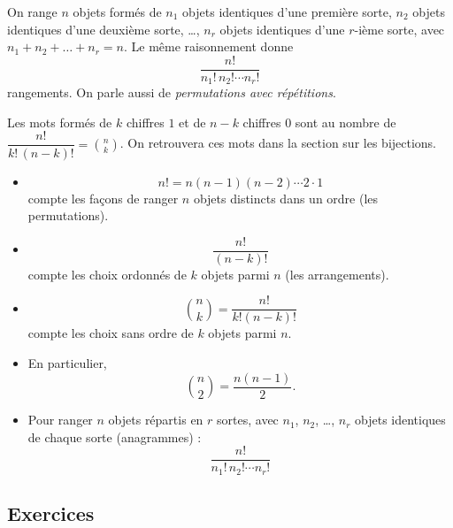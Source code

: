 \documentclass[11pt]{article}
\begin{document}
\begin{proposition}\label{prop:anagrammes}
On range \(n\) objets formés de \(n_1\) objets identiques d’une première sorte, \(n_2\) objets
identiques d’une deuxième sorte, \dots, \(n_r\) objets identiques d’une \(r\)-ième sorte, avec
\(n_1+n_2+\dots+n_r=n\). Le même raisonnement donne
\[
\boxed{\frac{n!}{n_1!\,n_2!\cdots n_r!}}
\]
rangements. On parle aussi de \emph{permutations avec répétitions}.
\end{proposition}

\begin{exemple}
Les mots formés de \(k\) chiffres \(1\) et de \(n-k\) chiffres \(0\) sont au nombre
de \(\dfrac{n!}{k!\,(n-k)!}=\binom{n}{k}\). On retrouvera ces mots dans la section sur les bijections.
\end{exemple}

\begin{retenir}
\begin{itemize}
    \item
    \[
    \boxed{n!=n(n-1)(n-2)\cdots 2\cdot 1}
    \]
    compte les façons de ranger \(n\) objets distincts dans un ordre (les permutations).

    \item
    \[
    \boxed{\frac{n!}{(n-k)!}}
    \]
    compte les choix ordonnés de \(k\) objets parmi \(n\) (les arrangements).

    \item
    \[
    \boxed{\binom{n}{k}=\frac{n!}{k!(n-k)!}}
    \]
    compte les choix sans ordre de \(k\) objets parmi \(n\).

    \item En particulier,
    \[
    \boxed{\binom{n}{2}=\frac{n(n-1)}{2}.}
    \]

    \item Pour ranger \(n\) objets répartis en \(r\) sortes, avec \(n_1\), \(n_2\), \dots, \(n_r\)
    objets identiques de chaque sorte (anagrammes) :
    \[
    \boxed{\frac{n!}{n_1!\,n_2!\cdots n_r!}}
    \]
\end{itemize}
\end{retenir}

\subsection*{Exercices}


\end{document}
